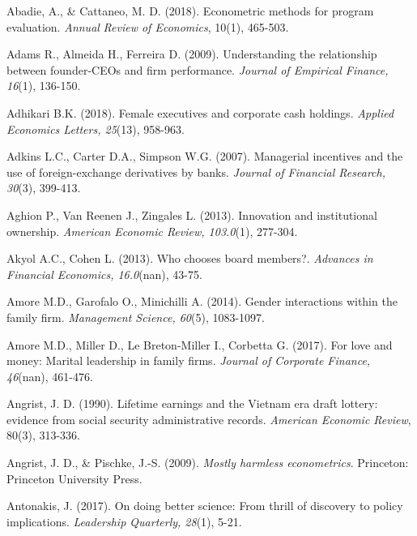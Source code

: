 \documentclass[english]{article}
\begin{document}
\begin{singlespace}

\begin{list}{}{\setlength\itemindent{-\leftmargin}}

\item Abadie, A., \& Cattaneo, M. D. (2018). Econometric methods for program evaluation. \emph{Annual} \emph{Review of Economics}, 10(1), 465-503.

\item *Adams R., Almeida H., Ferreira D. (2009). Understanding the relationship between founder-CEOs and firm performance. \emph{Journal of Empirical Finance, 16}(1), 136-150.

\item *Adhikari B.K. (2018). Female executives and corporate cash holdings.  \emph{Applied Economics Letters, 25}(13), 958-963.

\item *Adkins L.C., Carter D.A., Simpson W.G. (2007). Managerial incentives and the use of foreign-exchange derivatives by banks. \emph{Journal of Financial Research, 30}(3), 399-413.

\item *Aghion P., Van Reenen J., Zingales L. (2013). Innovation and institutional ownership. \emph{American Economic Review, 103.0}(1), 277-304.

\item *Akyol A.C., Cohen L. (2013). Who chooses board members?. \emph{Advances in Financial Economics, 16.0}(nan), 43-75.

\item *Amore M.D., Garofalo O., Minichilli A. (2014). Gender interactions within the family firm. \emph{Management Science, 60}(5), 1083-1097.

\item *Amore M.D., Miller D., Le Breton-Miller I., Corbetta G. (2017). For love and money: Marital leadership in family firms. \emph{Journal of Corporate Finance, 46}(nan), 461-476.

\item Angrist, J. D. (1990). Lifetime earnings and the Vietnam era draft lottery: evidence from social security administrative records.  \emph{American Economic Review}, 80(3), 313-336.

\item Angrist, J. D., \& Pischke, J.-S. (2009). \emph{Mostly harmless econometrics}. Princeton: Princeton University Press.

\item Antonakis, J. (2017). On doing better science: From thrill of discovery to policy implications. \emph{Leadership Quarterly, 28}(1), 5-21.


\end{list}
\end{singlespace}
\end{document}
